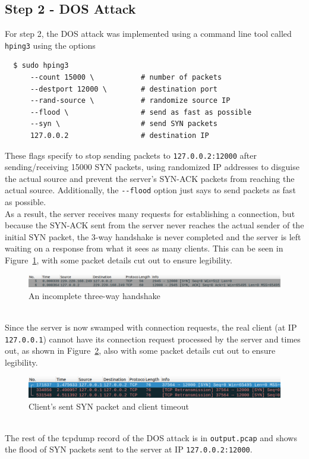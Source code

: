 \documentclass[11pt]{article}
\begin{document}
\subsection*{Step 2 - DOS Attack}
For step 2, the DOS attack was implemented using a command line tool called \verb|hping3| using
the options
\begin{verbatim}
  $ sudo hping3
      --count 15000 \           # number of packets
      --destport 12000 \        # destination port
      --rand-source \           # randomize source IP
      --flood \                 # send as fast as possible
      --syn \                   # send SYN packets
      127.0.0.2                 # destination IP
\end{verbatim}
These flags specify to stop sending packets to \verb|127.0.0.2:12000| after sending/receiving 15000
SYN packets, using randomized IP addresses to disguise the actual source and prevent the
server's SYN-ACK packets from reaching the actual source. Additionally, the \verb|--flood|
option just says to send packets as fast as possible.\\
As a result, the server receives many requests for establishing a connection, but because the
SYN-ACK sent from the server never reaches the actual sender of the initial SYN packet, the
3-way handshake is never completed and the server is left waiting on a response from what it
sees as many clients. This can be seen in Figure~\ref{fig:handshake}, with some packet details
cut out to ensure legibility.
\begin{figure}[htbp]
  \centering
  \includegraphics[width=1\linewidth]{./incomplete_handshake.png}
  \caption{\label{fig:handshake}
  An incomplete three-way handshake}
\end{figure}
\\
Since the server is now swamped with connection requests, the real client (at IP \verb|127.0.0.1|)
cannot have its connection request processed by the server and times out, as shown in
Figure~\ref{fig:timeout}, also with some packet details cut out to ensure legibility.
\begin{figure}[htbp]
  \centering
  \includegraphics[width=1\linewidth]{./client_timeout.png}
  \caption{\label{fig:timeout}
  Client's sent SYN packet and client timeout}
\end{figure}
\\
The rest of the tcpdump record of the DOS attack is in \verb|output.pcap| and shows the flood
of SYN packets sent to the server at IP \verb|127.0.0.2:12000|.
\end{document}
